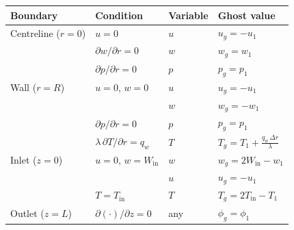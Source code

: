 \begin{center}
\begin{tabular}{llll}
\toprule
Boundary & Condition & Variable & Ghost value \\
\midrule
Centreline ($r=0$) & $u=0$               & $u$ & $u_g = -u_1$ \\
                   & $\partial w/\partial r=0$ & $w$ & $w_g = w_1$ \\
                   & $\partial p/\partial r=0$ & $p$ & $p_g = p_1$ \\
\midrule
Wall ($r=R$)       & $u=0$, $w=0$        & $u$ & $u_g = -u_1$ \\
                   &                     & $w$ & $w_g = -w_1$ \\
                   & $\partial p/\partial r=0$ & $p$ & $p_g = p_1$ \\
                   & $\lambda\,\partial T/\partial r=q_w$ & $T$ & $T_g = T_1 + \frac{q_w\,\Delta r}{\lambda}$ \\
\midrule
Inlet ($z=0$)      & $u=0$, $w=W_\text{in}$ & $w$ & $w_g = 2W_\text{in}-w_1$ \\
                   &                        & $u$ & $u_g = -u_1$ \\
                   & $T=T_\text{in}$        & $T$ & $T_g = 2T_\text{in}-T_1$ \\
\midrule
Outlet ($z=L$)     & $\partial(\cdot)/\partial z=0$ & any & $\phi_g = \phi_1$ \\
\bottomrule
\end{tabular}
\end{center}
